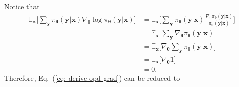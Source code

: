 \documentclass{article} %
\begin{document}
Notice that
\begin{equation}
\begin{aligned}
\mathbb{E}_{\boldsymbol{x}}  \Big[ 
\sum_{\boldsymbol{y}} \pi_{\boldsymbol{\theta}}  (\boldsymbol{y}| \boldsymbol{x} ) \nabla_{\boldsymbol{\theta}}   \log \pi_{\boldsymbol{\theta}}(\boldsymbol{y}| \boldsymbol{x} )
\Big] & = \mathbb{E}_{\boldsymbol{x}}  \Big[ 
\sum_{\boldsymbol{y}} \pi_{\boldsymbol{\theta}}  (\boldsymbol{y}| \boldsymbol{x} ) \frac{ \nabla_{\boldsymbol{\theta}} \pi_{\boldsymbol{\theta}}  (\boldsymbol{y}| \boldsymbol{x} )}{\pi_{\boldsymbol{\theta}}  (\boldsymbol{y}| \boldsymbol{x} )}
\Big] \\ &= 
\mathbb{E}_{\boldsymbol{x}} \Big[ 
\sum_{\boldsymbol{y}} \nabla_{\boldsymbol{\theta}} \pi_{\boldsymbol{\theta}}  (\boldsymbol{y}| \boldsymbol{x} )
\Big] \\ & =
\mathbb{E}_{\boldsymbol{x}}  \Big[
\nabla_{\boldsymbol{\theta}} \sum_{\boldsymbol{y}}  \pi_{\boldsymbol{\theta}}  (\boldsymbol{y}| \boldsymbol{x} )
\Big] \\ &=
\mathbb{E}_{\boldsymbol{x}}  \Big[
\nabla_{\boldsymbol{\theta}}  1
\Big] \\ &= 0.
\end{aligned}
\end{equation}
Therefore, Eq.~(\ref{eq: derive opd grad}) can be reduced to
\end{document}
